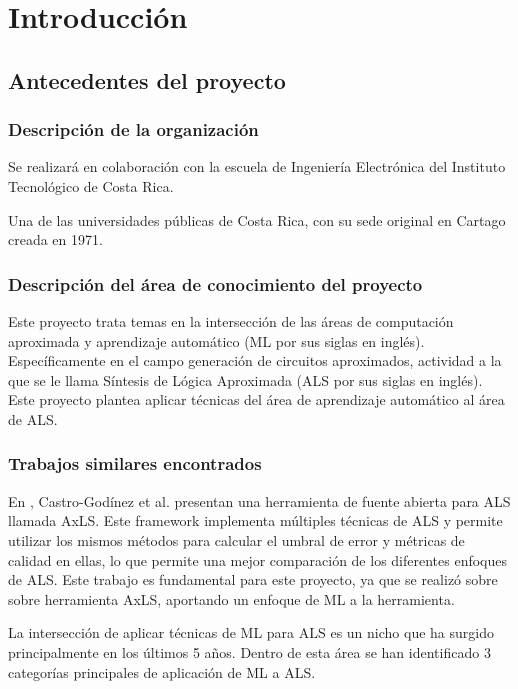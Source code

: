 \chapter{Introducción}

\section{Antecedentes del proyecto}

\subsection{Descripción de la organización}

Se realizará en colaboración con la escuela de Ingeniería Electrónica del
Instituto Tecnológico de Costa Rica.

Una de las universidades públicas de Costa Rica, con su sede original en
Cartago creada en 1971.

\subsection{Descripción del área de conocimiento del proyecto}

Este proyecto trata temas en la intersección de las áreas de computación
aproximada y aprendizaje automático (ML por sus siglas en inglés).
Específicamente en el campo generación de circuitos aproximados, actividad a la
que se le llama Síntesis de Lógica Aproximada (ALS por sus siglas en inglés).
Este proyecto plantea aplicar técnicas del área de aprendizaje automático al
área de ALS.

\subsection{Trabajos similares encontrados}

En \cite{castro-godinez_axls_2021}, Castro-Godínez et al. presentan una
herramienta de fuente abierta para ALS llamada AxLS. Este framework implementa
múltiples técnicas de ALS y permite utilizar los mismos métodos para calcular
el umbral de error y métricas de calidad en ellas, lo que permite una mejor
comparación de los diferentes enfoques de ALS. Este trabajo es fundamental para
este proyecto, ya que se realizó sobre sobre herramienta AxLS, aportando un
enfoque de ML a la herramienta.

La intersección de aplicar técnicas de ML para ALS es un nicho que ha surgido
principalmente en los últimos 5 años. Dentro de esta área se han identificado 3
categorías principales de aplicación de ML a ALS.

